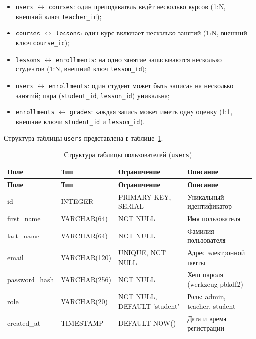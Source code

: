 \begin{itemize}
    \item \texttt{users} $\leftrightarrow$ \texttt{courses}: один преподаватель
          ведёт несколько курсов (1:N, внешний ключ \texttt{teacher\_id});
    \item \texttt{courses} $\leftrightarrow$ \texttt{lessons}: один курс включает
          несколько занятий (1:N, внешний ключ \texttt{course\_id});
    \item \texttt{lessons} $\leftrightarrow$ \texttt{enrollments}: на одно занятие
          записываются несколько студентов (1:N, внешний ключ \texttt{lesson\_id});
    \item \texttt{users} $\leftrightarrow$ \texttt{enrollments}: один студент
          может быть записан на несколько занятий; пара (\texttt{student\_id},
          \texttt{lesson\_id}) уникальна;
    \item \texttt{enrollments} $\leftrightarrow$ \texttt{grades}: каждая запись
          может иметь одну оценку (1:1, внешние ключи \texttt{student\_id}
          и \texttt{lesson\_id}).
\end{itemize}

Структура таблицы \texttt{users} представлена в таблице~\ref{tab:db_users}.

{\small
\begin{longtable}{|p{3.8cm}|p{2.8cm}|p{3.5cm}|p{4.4cm}|}
    \caption{Структура таблицы пользователей (\texttt{users})}
    \label{tab:db_users} \\
    \hline
    \textbf{Поле} & \textbf{Тип} & \textbf{Ограничение} & \textbf{Описание} \\ \hline
    \endfirsthead
    \tabcont{\ref{tab:db_users}}
    \textbf{Поле} & \textbf{Тип} & \textbf{Ограничение} & \textbf{Описание} \\ \hline
    \endhead
    \hline \endfoot
    \hline \endlastfoot
    id            & INTEGER      & PRIMARY KEY, SERIAL        & Уникальный идентификатор \\ \hline
    first\_name   & VARCHAR(64)  & NOT NULL                   & Имя пользователя \\ \hline
    last\_name    & VARCHAR(64)  & NOT NULL                   & Фамилия пользователя \\ \hline
    email         & VARCHAR(120) & UNIQUE, NOT NULL           & Адрес электронной почты \\ \hline
    password\_hash & VARCHAR(256) & NOT NULL                  & Хеш пароля (werkzeug pbkdf2) \\ \hline
    role          & VARCHAR(20)  & NOT NULL, DEFAULT 'student' & Роль: admin, teacher, student \\ \hline
    created\_at   & TIMESTAMP    & DEFAULT NOW()              & Дата и время регистрации \\ \hline
\end{longtable}
}

